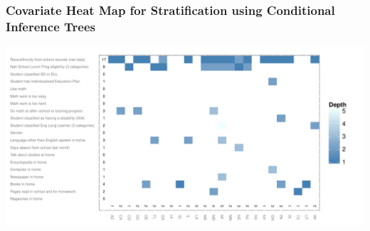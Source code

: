 \documentclass[10pt,handout,mathserif]{beamer}
\begin{document}
\begin{frame}[c]
	\frametitle{Covariate Heat Map for Stratification using Conditional Inference Trees}
	\begin{center}
	\includegraphics[width=\paperwidth,keepaspectratio]{../Figures2009/g4math-mlpsa-ctree-heat}
	\end{center}
\end{frame}


{ %
    \begin{frame}[plain]
     \end{frame}
}
\end{document}
